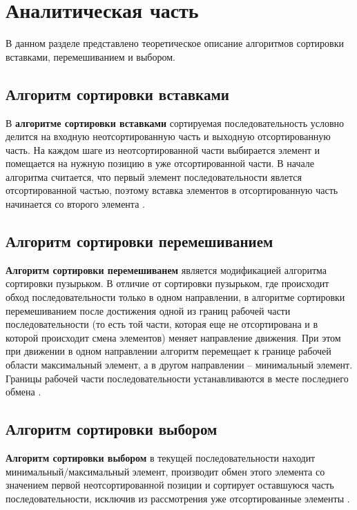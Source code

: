 \chapter{Аналитическая часть}

В данном разделе представлено теоретическое описание алгоритмов сортировки вставками, перемешиванием и выбором.

\section{Алгоритм сортировки вставками}

В \textbf{алгоритме сортировки вставками} сортируемая последовательность
условно делится на входную неотсортированную часть и выходную отсортированную
часть. На каждом шаге из неотсортированной части выбирается элемент и
помещается на нужную позицию в уже отсортированной части. В начале алгоритма
считается, что первый элемент последовательности явлется отсортированной
частью, поэтому вставка элементов в отсортированную часть начинается со второго
элемента \cite{sorts}.

\section{Алгоритм сортировки перемешиванием}

\textbf{Алгоритм сортировки перемешиванем} является модификацией алгоритма
сортировки пузырьком. В отличие от сортировки пузырьком, где происходит обход
последовательности только в одном направлении, в алгоритме сортировки
перемешиванием после достижения одной из границ рабочей части
последовательности (то есть той части, которая еще не отсортирована и в которой
происходит смена элементов) меняет направление движения. При этом при движении
в одном направлении алгоритм перемещает к границе рабочей области максимальный
элемент, а в другом направлении -- минимальный элемент. Границы рабочей части
последовательности устанавливаются в месте последнего обмена \cite{sorts}. 

\section{Алгоритм сортировки выбором}

\textbf{Алгоритм сортировки выбором} в текущей последовательности находит
минимальный/максимальный элемент, производит обмен этого элемента со значением
первой неотсортированной позиции и сортирует оставшуюся часть
последовательности, исключив из рассмотрения уже отсортированные элементы
\cite{sorts}.

